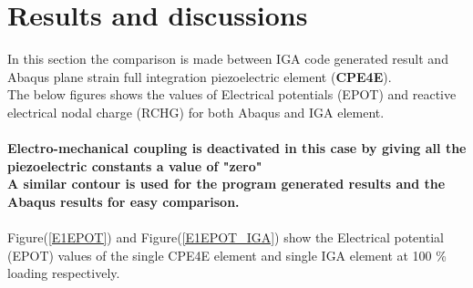 \documentclass[12pt]{article}
\begin{document}
\section{Results and discussions}
In this section the comparison is made between IGA code generated result and Abaqus plane strain full integration piezoelectric element (\textbf{CPE4E}).\\The below figures shows the values of Electrical potentials (EPOT) and reactive electrical nodal charge (RCHG) for both Abaqus and IGA element.\\
\\\textbf{Electro-mechanical coupling is deactivated in this case by giving all the piezoelectric constants a value of "zero"  }
\\
\textbf{A similar contour is used for the program generated results and the Abaqus results for easy comparison. }\\
\\
Figure(\ref{E1EPOT}) and Figure(\ref{E1EPOT_IGA}) show the Electrical potential (EPOT) values of the single CPE4E element and single IGA element at 100 \% loading respectively. \\
\end{document}
